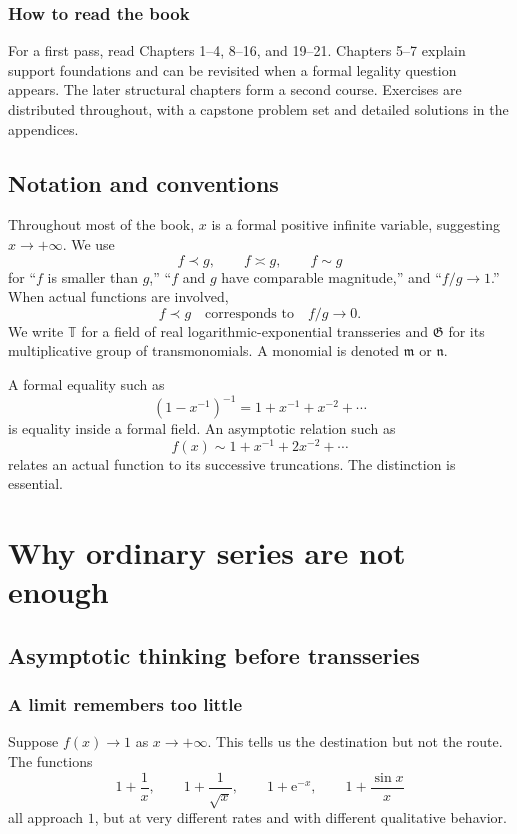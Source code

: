 \documentclass[11pt,oneside,openany]{book}
\newcommand{\T}{\mathbb{T}}
\newcommand{\G}{\mathfrak{G}}
\newcommand{\e}{\mathrm{e}}
\newcommand{\mon}{\mathfrak{m}}
\newcommand{\nmon}{\mathfrak{n}}
\theoremstyle{plain}
\theoremstyle{definition}
\theoremstyle{remark}
\begin{document}
\section*{How to read the book}
For a first pass, read Chapters 1--4, 8--16, and 19--21. Chapters 5--7 explain support foundations and can be revisited when a formal legality question appears. The later structural chapters form a second course. Exercises are distributed throughout, with a capstone problem set and detailed solutions in the appendices.

\tableofcontents

\chapter*{Notation and conventions}

Throughout most of the book, $x$ is a formal positive infinite variable, suggesting $x\to+\infty$. We use
\[
  f\prec g,
  \qquad f\asymp g,
  \qquad f\sim g
\]
for ``$f$ is smaller than $g$,'' ``$f$ and $g$ have comparable magnitude,'' and ``$f/g\to1$.'' When actual functions are involved,
\[
  f\prec g\quad\text{corresponds to}\quad f/g\to0.
\]
We write $\T$ for a field of real logarithmic-exponential transseries and $\G$ for its multiplicative group of transmonomials. A monomial is denoted $\mon$ or $\nmon$.

A formal equality such as
\[
  (1-x^{-1})^{-1}=1+x^{-1}+x^{-2}+\cdots
\]
is equality inside a formal field. An asymptotic relation such as
\[
  f(x)\sim1+x^{-1}+2x^{-2}+\cdots
\]
relates an actual function to its successive truncations. The distinction is essential.

\mainmatter

\part{Why ordinary series are not enough}

\chapter{Asymptotic thinking before transseries}
\label{ch:asymptotic-thinking}

\section{A limit remembers too little}
Suppose $f(x)\to1$ as $x\to+\infty$. This tells us the destination but not the route. The functions
\[
  1+\frac1x,
  \qquad1+\frac1{\sqrt{x}},
  \qquad1+\e^{-x},
  \qquad1+\frac{\sin x}{x}
\]
all approach $1$, but at very different rates and with different qualitative behavior.
\end{document}
